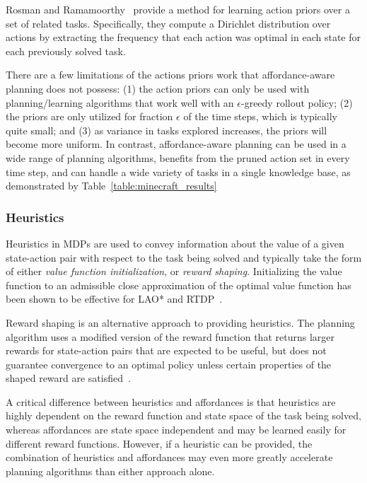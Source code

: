 \documentclass[letterpaper]{article}
\newcommand{\dnote}[1]{\textcolor{Green}{\textbf{}}}
\begin{document}
Rosman and Ramamoorthy~\cite{rosman2012good} provide a method for learning action
priors over a set of related tasks. Specifically, they compute a Dirichlet distribution over 
actions by extracting the frequency that each action was optimal in each state for each 
previously solved task.

There are a few limitations of the actions priors work that affordance-aware planning
does not possess: (1) the action priors can only be used with planning/learning algorithms
that work well with an $\epsilon$-greedy rollout policy; (2) the priors are only utilized for 
fraction $\epsilon$ of the time steps, which is typically quite small; and (3) as variance in
tasks explored increases, the priors will become more uniform. In contrast, affordance-aware
planning can be used in a wide range of planning algorithms, benefits from the pruned action
set in every time step, and can handle a wide variety of tasks in a single knowledge base,
as demonstrated by Table~\ref{table:minecraft_results}

\dnote{Policy priors addition?}

\subsubsection{Heuristics}
Heuristics in MDPs are used to convey information about the value of a given state-action
pair with respect to the task being solved and typically take the form of either {\em value function initialization},
or {\em reward shaping}. Initializing the value function to an admissible close approximation of the optimal
value function has been shown to be effective for LAO* and RTDP~\cite{Hansen:1999qf}.

Reward shaping is an alternative approach to providing heuristics. The planning algorithm
uses a modified version of the reward function that returns larger rewards for state-action
pairs that are expected to be useful, but does not guarantee convergence to an optimal
policy unless certain properties of the shaped reward are satisfied~\cite{potshap}.

A critical difference between heuristics and affordances is that heuristics are highly dependent
on the reward function and state space of the task being solved, whereas affordances are state
space independent and may be learned easily for different reward functions. However, if a heuristic
can be provided, the combination of heuristics and affordances may even more greatly accelerate
planning algorithms than either approach alone.
\end{document}
